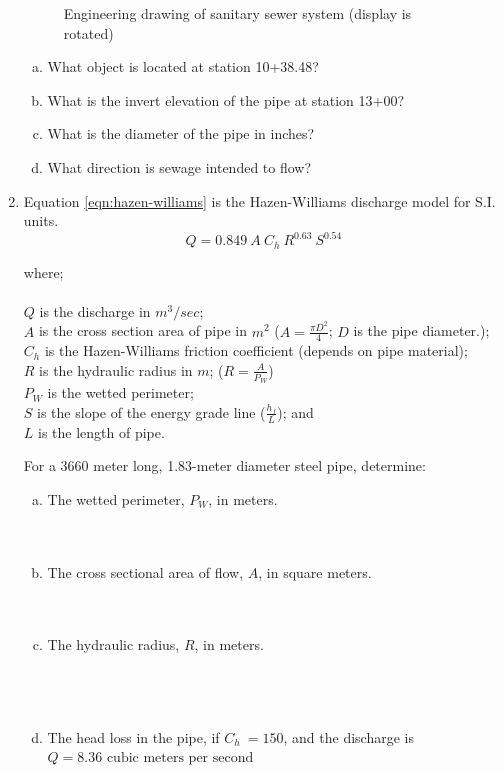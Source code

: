 \documentclass[11pt]{article}
\newcommand\tab[1][1cm]{\hspace*{#1}}
\begin{document}
\begin{enumerate}
\begin{figure}[h!]
   \caption{Engineering drawing of sanitary sewer system (display is rotated)}
   \label{fig:SewerDrawing}
\end{figure}

\begin{enumerate}[(a)]
\item What object is located at station 10+38.48?
\item What is the invert elevation of the pipe at station 13+00?
\item What is the diameter of the pipe in inches?
\item What direction is sewage intended to flow?
\end{enumerate}
\clearpage
\item Equation \ref{eqn:hazen-williams} is the  Hazen-Williams discharge model for S.I. units.
\begin{equation}
Q = 0.849~A~C_h~R^{0.63}~S^{0.54}
\label{eqn:hazen-williams}
\end{equation}

where;\\~\\
\tab $Q$ is the discharge in $m^3/sec$;\\
\tab $A$ is the cross section area of pipe in $m^2$ ($A = \frac{\pi D^2}{4}$; $D$ is the pipe diameter.);\\
\tab $C_h$ is the Hazen-Williams friction coefficient (depends on pipe material);\\
\tab $R $ is the hydraulic radius in $m$;  ($R=\frac{A}{P_W}$)\\
\tab $P_W$ is the wetted perimeter; \\
\tab $S$ is the slope of the energy grade line ($\frac{h_f}{L}$); and \\
\tab $L$ is the length of pipe.

For a 3660 meter long, 1.83-meter diameter steel pipe, determine:
\begin{enumerate}[(a)]
\item The wetted perimeter, $P_W$, in meters. \\~\\~\\
\item The cross sectional area of flow, $A$, in square meters. \\~\\~\\
\item The hydraulic radius, $R$, in meters. \\~\\~\\~\\
\item The head loss in the pipe, if $C_h~=150$, and the discharge is $Q=8.36\text{~cubic meters per second}$


\end{enumerate}
\end{enumerate}
\end{document}
